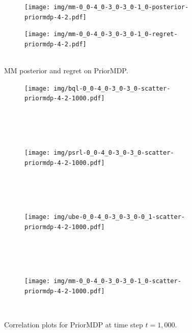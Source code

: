 \documentclass{article}
\begin{document}
\begin{appendices}
\begin{figure}[h!]
\centering
\begin{subfigure}{0.65\textwidth}
\texttt{[image: img/mm-0\_0-4\_0-3\_0-3\_0-1\_0-posterior-priormdp-4-2.pdf]}
\end{subfigure}
\begin{subfigure}{0.34\textwidth}
\texttt{[image: img/mm-0\_0-4\_0-3\_0-3\_0-1\_0-regret-priormdp-4-2.pdf]}~\\~\\
\end{subfigure}
\captionsetup{width=0.9\linewidth}
\caption{MM posterior and regret on PriorMDP.}\label{mm_priormdp_visual}
\end{figure}


\clearpage

\begin{figure}[h!]
\centering
\begin{subfigure}{1.0\textwidth}
\texttt{[image: img/bql-0\_0-4\_0-3\_0-3\_0-scatter-priormdp-4-2-1000.pdf]}
\end{subfigure}\\
~\\
~\\
\begin{subfigure}{1.0\textwidth}
\texttt{[image: img/psrl-0\_0-4\_0-3\_0-3\_0-scatter-priormdp-4-2-1000.pdf]}
\end{subfigure}\\
~\\
~\\
\begin{subfigure}{1.0\textwidth}
\texttt{[image: img/ube-0\_0-4\_0-3\_0-3\_0-0\_1-scatter-priormdp-4-2-1000.pdf]}
\end{subfigure}\\
~\\
~\\
\begin{subfigure}{1.0\textwidth}
\texttt{[image: img/mm-0\_0-4\_0-3\_0-3\_0-1\_0-scatter-priormdp-4-2-1000.pdf]}
\end{subfigure}\\
\captionsetup{width=0.9\linewidth}
\caption{Correlation plots for PriorMDP at time step $t = 1,000$.}\label{correlations_priormdp_500}
\end{figure}


\end{appendices}
\end{document}
